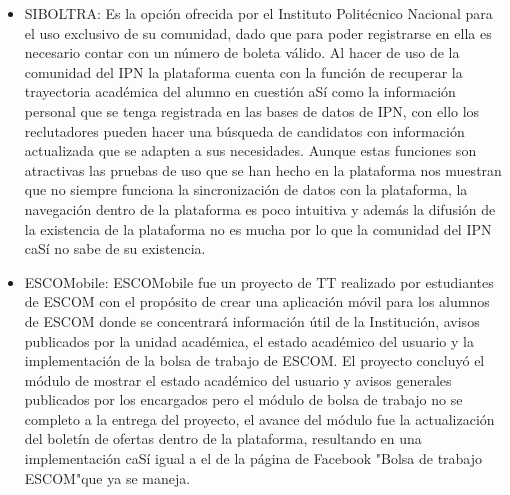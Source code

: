 \begin{itemize}
    \item SIBOLTRA: Es la opción ofrecida por el Instituto Politécnico Nacional para el uso exclusivo de su comunidad, dado que 
    para poder registrarse en ella es necesario contar con un número de boleta válido. Al hacer de uso de la comunidad del IPN la 
    plataforma cuenta con la función de recuperar la trayectoria académica del alumno en cuestión aSí como la información personal 
    que se tenga registrada en las bases de datos de IPN, con ello los reclutadores pueden hacer una búsqueda de candidatos con 
    información actualizada que se adapten a sus necesidades. Aunque estas funciones son atractivas las pruebas de uso que se han 
    hecho en la plataforma nos muestran que no siempre funciona la sincronización de datos con la plataforma, la navegación dentro 
    de la plataforma es poco intuitiva y además la difusión de la existencia de la plataforma no es mucha por lo que la comunidad 
    del IPN caSí no sabe de su existencia. 
    
    \item ESCOMobile: ESCOMobile fue un proyecto de TT realizado por estudiantes de ESCOM con el propósito de crear una aplicación 
    móvil para los alumnos de ESCOM donde se concentrará información útil de la Institución, avisos publicados por la unidad 
    académica, el estado académico del usuario y la implementación de la bolsa de trabajo de ESCOM. El proyecto concluyó el módulo 
    de mostrar el estado académico del usuario y avisos generales publicados por los encargados pero el módulo de bolsa de trabajo 
    no se completo a la entrega del proyecto, el avance del módulo fue la actualización del boletín de ofertas dentro de la 
    plataforma, resultando en una implementación caSí igual a el de la página de Facebook "Bolsa de trabajo ESCOM"que ya se maneja.

\end{itemize}

